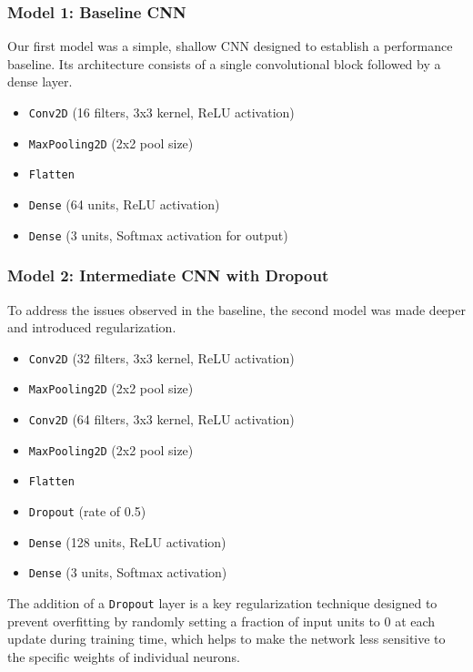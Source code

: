 \documentclass[pdflatex,sn-mathphys-num]{sn-jnl}%
\theoremstyle{thmstyleone}%
\theoremstyle{thmstyletwo}%
\theoremstyle{thmstylethree}%
\begin{document}
\subsubsection{Model 1: Baseline CNN}
Our first model was a simple, shallow CNN designed to establish a performance baseline. Its architecture consists of a single convolutional block followed by a dense layer.
\begin{itemize}
    \item \texttt{Conv2D} (16 filters, 3x3 kernel, ReLU activation)
    \item \texttt{MaxPooling2D} (2x2 pool size)
    \item \texttt{Flatten}
    \item \texttt{Dense} (64 units, ReLU activation)
    \item \texttt{Dense} (3 units, Softmax activation for output)
\end{itemize}

\subsubsection{Model 2: Intermediate CNN with Dropout}
To address the issues observed in the baseline, the second model was made deeper and introduced regularization.
\begin{itemize}
    \item \texttt{Conv2D} (32 filters, 3x3 kernel, ReLU activation)
    \item \texttt{MaxPooling2D} (2x2 pool size)
    \item \texttt{Conv2D} (64 filters, 3x3 kernel, ReLU activation)
    \item \texttt{MaxPooling2D} (2x2 pool size)
    \item \texttt{Flatten}
    \item \texttt{Dropout} (rate of 0.5)
    \item \texttt{Dense} (128 units, ReLU activation)
    \item \texttt{Dense} (3 units, Softmax activation)
\end{itemize}
The addition of a \texttt{Dropout} layer is a key regularization technique designed to prevent overfitting by randomly setting a fraction of input units to 0 at each update during training time, which helps to make the network less sensitive to the specific weights of individual neurons.
\end{document}
